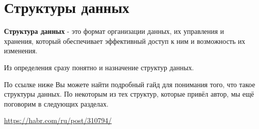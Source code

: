 \section{Структуры данных}

\begin{definition}
\textbf{Структура данных} - это формат организации данных, их управления и хранения, который обеспечивает эффективный доступ к ним и возможность их изменения.
\end{definition}

\begin{notice}
Из определения сразу понятно и назначение структур данных.
\end{notice}

По ссылке ниже Вы можете найти подробный гайд для понимания того, что такое структуры данных. По некоторым из тех структур, которые привёл автор, мы ещё поговорим в следующих разделах.

\url{https://habr.com/ru/post/310794/}